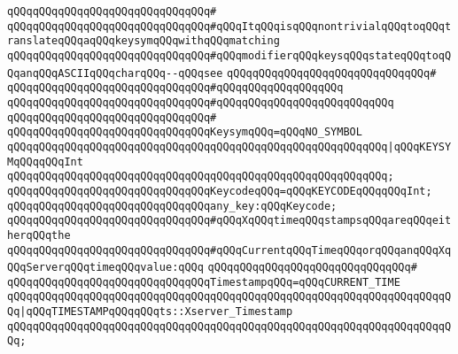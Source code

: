 \verb|qQQqqQQqqQQqqQQqqQQqqQQqqQQqqQQq#|\newline
\verb|qQQqqQQqqQQqqQQqqQQqqQQqqQQqqQQq#qQQqItqQQqisqQQqnontrivialqQQqtoqQQqtranslateqQQqaqQQqkeysymqQQqwithqQQqmatching|\newline
\verb|qQQqqQQqqQQqqQQqqQQqqQQqqQQqqQQq#qQQqmodifierqQQqkeysqQQqstateqQQqtoqQQqanqQQqASCIIqQQqcharqQQq--qQQqsee|\newline
\verb|qQQqqQQqqQQqqQQqqQQqqQQqqQQqqQQq#|\newline
\verb|qQQqqQQqqQQqqQQqqQQqqQQqqQQqqQQq#qQQqqQQqqQQqqQQqqQQq|\newline
\verb|qQQqqQQqqQQqqQQqqQQqqQQqqQQqqQQq#qQQqqQQqqQQqqQQqqQQqqQQqqQQq|\newline
\verb|qQQqqQQqqQQqqQQqqQQqqQQqqQQqqQQq#|\newline
\verb|qQQqqQQqqQQqqQQqqQQqqQQqqQQqqQQqKeysymqQQq=qQQqNO_SYMBOL|\newline
\verb|qQQqqQQqqQQqqQQqqQQqqQQqqQQqqQQqqQQqqQQqqQQqqQQqqQQqqQQqqQQq|\verb#|qQQqKEYSYMqQQqqQQqInt#\newline
\verb|qQQqqQQqqQQqqQQqqQQqqQQqqQQqqQQqqQQqqQQqqQQqqQQqqQQqqQQqqQQq;|\newline
\newline
\verb|qQQqqQQqqQQqqQQqqQQqqQQqqQQqqQQqKeycodeqQQq=qQQqKEYCODEqQQqqQQqInt;|\newline
\newline
\verb|qQQqqQQqqQQqqQQqqQQqqQQqqQQqqQQqany_key:qQQqKeycode;|\newline
\newline
\verb|qQQqqQQqqQQqqQQqqQQqqQQqqQQqqQQq#qQQqXqQQqtimeqQQqstampsqQQqareqQQqeitherqQQqthe|\newline
\verb|qQQqqQQqqQQqqQQqqQQqqQQqqQQqqQQq#qQQqCurrentqQQqTimeqQQqorqQQqanqQQqXqQQqServerqQQqtimeqQQqvalue:qQQq|\newline
\verb|qQQqqQQqqQQqqQQqqQQqqQQqqQQqqQQq#|\newline
\verb|qQQqqQQqqQQqqQQqqQQqqQQqqQQqqQQqTimestampqQQq=qQQqCURRENT_TIME|\newline
\verb|qQQqqQQqqQQqqQQqqQQqqQQqqQQqqQQqqQQqqQQqqQQqqQQqqQQqqQQqqQQqqQQqqQQqqQQq|\verb#|qQQqTIMESTAMPqQQqqQQqts::Xserver_Timestamp#\newline
\verb|qQQqqQQqqQQqqQQqqQQqqQQqqQQqqQQqqQQqqQQqqQQqqQQqqQQqqQQqqQQqqQQqqQQqqQQq;|\newline
\newline
\newline
